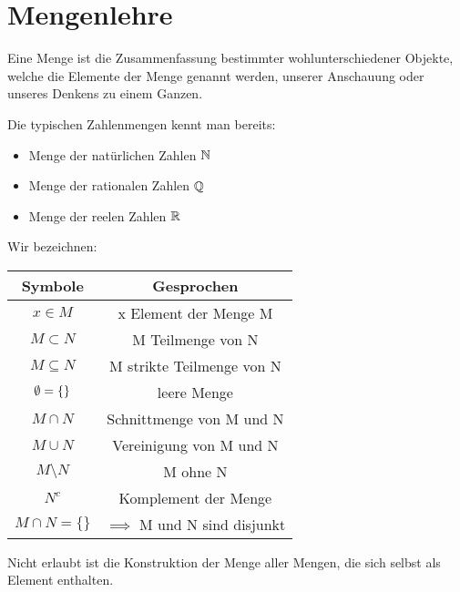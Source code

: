 \section{Mengenlehre}
\begin{definition} 
	Eine Menge ist die Zusammenfassung bestimmter wohlunterschiedener Objekte, welche die Elemente der Menge genannt werden, unserer Anschauung oder unseres Denkens zu einem Ganzen.
\end{definition}
\begin{example}
Die typischen Zahlenmengen kennt man bereits:
\begin{itemize}
	\item Menge der natürlichen Zahlen $\mathbb{N}$
	\item Menge der rationalen Zahlen $\mathbb{Q}$ 
	\item Menge der reelen Zahlen $\mathbb{R}$
\end{itemize}
\end{example}
\begin{notation}Wir bezeichnen:
\begin{table}[htpb]
	\centering
	\begin{tabular}{c|c}
		Symbole & Gesprochen \\
		\hline
		$x \in M$ & x Element der Menge M \\
		$M \subset N$ & M Teilmenge von N \\
		$M \subseteq N$ & M strikte Teilmenge von N \\
		$\emptyset = \{ \} $ & leere Menge \\
		$M \cap N$ & Schnittmenge von M und N \\
		$M \cup N$ & Vereinigung von M und N \\
		$M \setminus N$ & M ohne N \\
		$N^{c}$ & Komplement der Menge \\
		$M \cap N = \{ \} $ & $\implies$ M und N sind disjunkt
	\end{tabular}
\end{table}
\end{notation}
\begin{remark}
	Nicht erlaubt ist die Konstruktion der Menge aller Mengen, die sich selbst als Element enthalten.
\end{remark}
